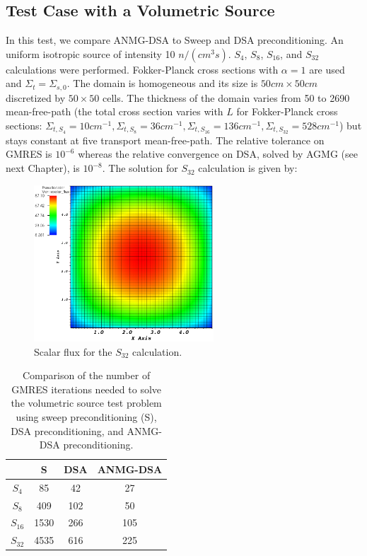 \subsection{Test Case with a Volumetric Source}
In this test, we compare ANMG-DSA to Sweep and DSA preconditioning. An uniform
isotropic source of intensity 10 $n/(cm^3 s)$. $S_4$, $S_8$, $S_{16}$, and
$S_{32}$ calculations were performed. Fokker-Planck cross sections with
$\alpha=1$ are used and $\Sigma_t = \Sigma_{s,0}$. The domain is homogeneous
and its size is $50cm \times 50cm$ discretized by $50\times 50$ cells. The 
thickness of the domain varies from 50 to 2690 mean-free-path (the total cross 
section varies with $L$ for Fokker-Planck cross sections: $\Sigma_{t,S_4}=10cm^{-1},
\Sigma_{t,S_8}=36cm^{-1}, \Sigma_{t,S_{16}}=136cm^{-1}, 
\Sigma_{t,S_{32}}=528cm^{-1}$) but stays constant at five transport
mean-free-path. The relative tolerance on GMRES is $10^{-6}$ whereas the
relative convergence on DSA, solved by AGMG (see next Chapter), is $10^{-8}$.
The solution for $S_{32}$ calculation is given by:
\begin{figure}[H]
  \centering
  \includegraphics[width=0.6\textwidth]{Anmg/homog_anmg_crop}
  \caption{Scalar flux for the $S_{32}$ calculation.}
\end{figure}
\begin{table}[H]
  \begin{center}
    \caption{Comparison of the number of GMRES iterations needed to solve the 
      volumetric source test problem using sweep preconditioning (S), DSA 
    preconditioning, and ANMG-DSA preconditioning.}
    \begin{tabular}{|c|c|c|c|}
      \hline
      & S & DSA & ANMG-DSA \\
      \hline
      $S_4$ & 85   & 42  & 27  \\
      $S_8$ & 409  & 102 & 50  \\
   $S_{16}$ & 1530 & 266 & 105 \\
   $S_{32}$ & 4535 & 616 & 225 \\
      \hline
    \end{tabular}
    \label{table_gmres_homog}
  \end{center}
\end{table}
